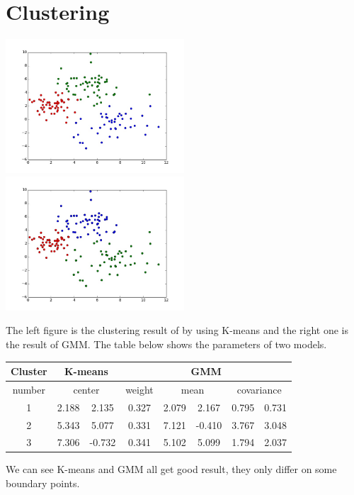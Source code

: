 \documentclass{article}
\begin{document}
\section{Clustering}
\includegraphics[width=0.5\textwidth]{../result/kmeans.jpg}
\includegraphics[width=0.5\textwidth]{../result/gmm.jpg}

The left figure is the clustering result of by using K-means and the right one is the result of GMM. The table below shows the parameters of two models.

\begin{center}
\begin{tabular}{|c|c|c|c|c|c|c|c|}
\hline \bf{Cluster} & \multicolumn{2}{c|}{\bf{K-means}} & \multicolumn{5}{c|}{\bfseries{GMM}} \\
\hline
number & \multicolumn{2}{c|}{center} & weight & \multicolumn{2}{c|}{mean} & \multicolumn{2}{c|}{covariance} \\
\hline 1 & 2.188 & 2.135 & 0.327 & 2.079 & 2.167 & 0.795 & 0.731 \\
\hline 2 & 5.343 & 5.077 & 0.331 & 7.121 & -0.410 & 3.767 & 3.048 \\
\hline 3 & 7.306 & -0.732 & 0.341 & 5.102 & 5.099 & 1.794 & 2.037 \\
\hline
\end{tabular}
\end{center}

We can see K-means and GMM all get good result, they only differ on some boundary points.
\end{document}
